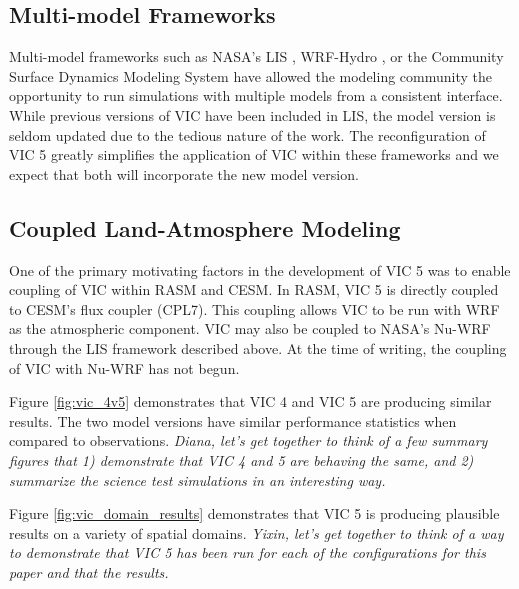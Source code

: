 \documentclass[gmd, manuscript]{copernicus}
\begin{document}
  \subsection{Multi-model Frameworks}
    \label{sec:multimodel}
    Multi-model frameworks such as NASA's LIS \citep{Kumar_2006}, WRF-Hydro \citep{Gochis_2013}, or the Community Surface Dynamics Modeling System \citep{Peckham_2016} have allowed the modeling community the opportunity to run simulations with multiple models from a consistent interface.
    While previous versions of VIC have been included in LIS, the model version is seldom updated due to the tedious nature of the work.
    The reconfiguration of VIC 5 greatly simplifies the application of VIC within these frameworks and we expect that both will incorporate the new model version.

  \subsection{Coupled Land-Atmosphere Modeling}
    \label{sec:coupled_apps}
    One of the primary motivating factors in the development of VIC 5 was to enable coupling of VIC within RASM and CESM.
    In RASM, VIC 5 is directly coupled to CESM's flux coupler (CPL7).
    This coupling allows VIC to be run with WRF as the atmospheric component.
    VIC may also be coupled to NASA's Nu-WRF through the LIS framework described above.
    At the time of writing, the coupling of VIC with Nu-WRF has not begun.


  Figure \ref{fig:vic_4v5} demonstrates that VIC 4 and VIC 5 are producing similar results.
  The two model versions have similar performance statistics when compared to observations.
  \textit{Diana, let's get together to think of a few summary figures that 1) demonstrate that VIC 4 and 5 are behaving the same, and 2) summarize the science test simulations in an interesting way.}

  Figure \ref{fig:vic_domain_results} demonstrates that VIC 5 is producing plausible results on a variety of spatial domains.
  \textit{Yixin, let's get together to think of a way to demonstrate that VIC 5 has been run for each of the configurations for this paper and that the results.}
\end{document}
